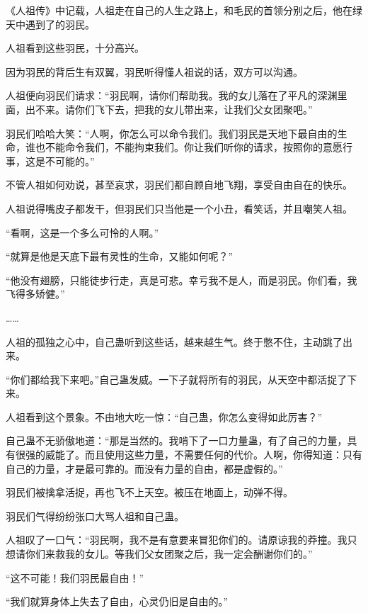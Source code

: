 
\begin{this_body}



《人祖传》中记载，人祖走在自己的人生之路上，和毛民的首领分别之后，他在绿天中遇到了的羽民。

人祖看到这些羽民，十分高兴。

因为羽民的背后生有双翼，羽民听得懂人祖说的话，双方可以沟通。

人祖便向羽民们请求：“羽民啊，请你们帮助我。我的女儿落在了平凡的深渊里面，出不来。请你们飞下去，把我的女儿带出来，让我们父女团聚吧。”

羽民们哈哈大笑：“人啊，你怎么可以命令我们。我们羽民是天地下最自由的生命，谁也不能命令我们，不能拘束我们。你让我们听你的请求，按照你的意愿行事，这是不可能的。”

不管人祖如何劝说，甚至哀求，羽民们都自顾自地飞翔，享受自由自在的快乐。

人祖说得嘴皮子都发干，但羽民们只当他是一个小丑，看笑话，并且嘲笑人祖。

“看啊，这是一个多么可怜的人啊。”

“就算是他是天底下最有灵性的生命，又能如何呢？”

“他没有翅膀，只能徒步行走，真是可悲。幸亏我不是人，而是羽民。你们看，我飞得多矫健。”

……

人祖的孤独之心中，自己蛊听到这些话，越来越生气。终于憋不住，主动跳了出来。

“你们都给我下来吧。”自己蛊发威。一下子就将所有的羽民，从天空中都活捉了下来。

人祖看到这个景象。不由地大吃一惊：“自己蛊，你怎么变得如此厉害？”

自己蛊不无骄傲地道：“那是当然的。我啃下了一口力量蛊，有了自己的力量，具有很强的威能了。而且使用这些力量，不需要任何的代价。人啊，你得知道：只有自己的力量，才是最可靠的。而没有力量的自由，都是虚假的。”

羽民们被擒拿活捉，再也飞不上天空。被压在地面上，动弹不得。

羽民们气得纷纷张口大骂人祖和自己蛊。

人祖叹了一口气：“羽民啊，我不是有意要来冒犯你们的。请原谅我的莽撞。我只想请你们来救我的女儿。等我们父女团聚之后，我一定会酬谢你们的。”

“这不可能！我们羽民最自由！”

“我们就算身体上失去了自由，心灵仍旧是自由的。”


\end{this_body}

